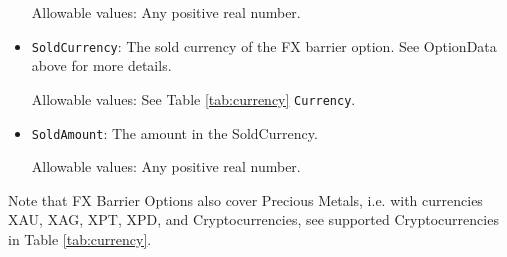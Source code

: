 \begin{itemize}
Allowable values:  Any positive real number.

\item \lstinline!SoldCurrency!: The sold currency of the FX barrier option. See OptionData above for more details.

Allowable values:  See Table \ref{tab:currency} \lstinline!Currency!.

\item \lstinline!SoldAmount!: The amount in the SoldCurrency.  

Allowable values:  Any positive real number.

\end{itemize}

Note that FX Barrier Options also cover Precious Metals, i.e. with
currencies XAU, XAG, XPT, XPD, and Cryptocurrencies,  see supported Cryptocurrencies in Table \ref{tab:currency}.